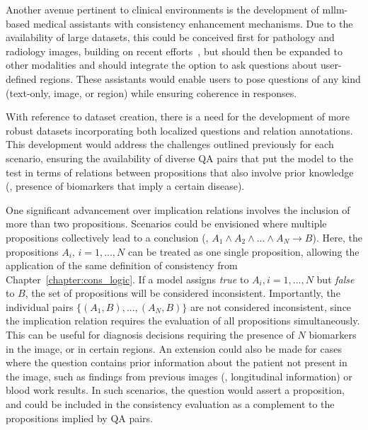 Another avenue pertinent to clinical environments is the development of \gls{mllm}-based medical assistants with consistency enhancement mechanisms. Due to the availability of large datasets, this could be conceived first for pathology and radiology images, building on recent efforts~\cite{pellegrini2023radialog,lu2023foundational,sun2023pathasst}, but should then be expanded to other modalities and should integrate the option to ask questions about user-defined regions. These assistants would enable users to pose questions of any kind (text-only, image, or region) while ensuring coherence in responses. 

With reference to dataset creation, there is a need for the development of more robust datasets incorporating both localized questions and relation annotations. This development would address the challenges outlined previously for each scenario, ensuring the availability of diverse QA pairs that put the model to the test in terms of relations between propositions that also involve prior knowledge (\eg, presence of biomarkers that imply a certain disease). 

One significant advancement over implication relations involves the inclusion of more than two propositions. Scenarios could be envisioned where multiple propositions collectively lead to a conclusion (\ie, $A_1 \wedge A_2 \wedge ... \wedge A_N \rightarrow B$). Here, the propositions $A_i, \, i= 1,...,N $ can be treated as one single proposition, allowing the application of the same definition of consistency from Chapter~\ref{chapter:cons_logic}. If a model assigns \textit{true} to $A_i, i= 1,...,N$ but \textit{false} to $B$, the set of propositions will be considered inconsistent. Importantly, the individual pairs $\{ (A_1, B), ..., (A_N, B) \}$ are not considered inconsistent, since the implication relation requires the evaluation of all propositions simultaneously. This can be useful for diagnosis decisions requiring the presence of $N$ biomarkers in the image, or in certain regions. An extension could also be made for cases where the question contains prior information about the patient not present in the image, such as findings from previous images (\ie, longitudinal information) or blood work results. In such scenarios, the question would assert a proposition, and could be included in the consistency evaluation as a complement to the propositions implied by QA pairs.  

